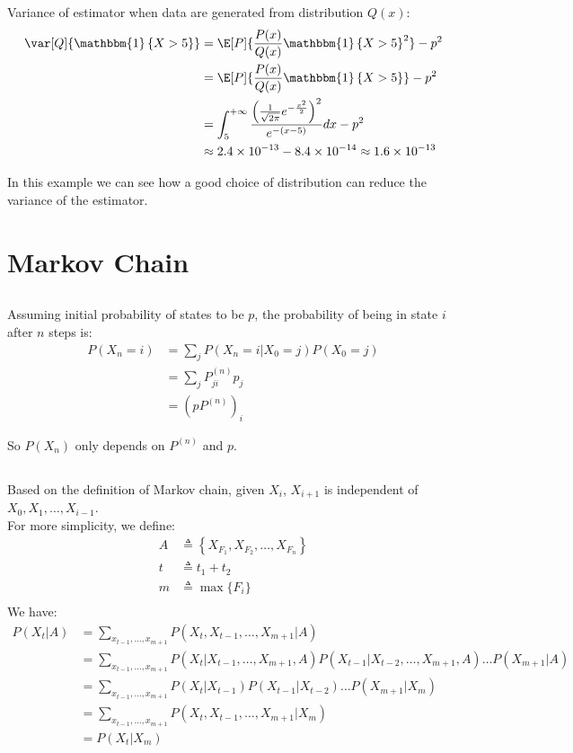 \documentclass{article}
\begin{document}
Variance of estimator when data are generated from distribution \(Q(x)\):
\begin{align*}
\var[Q]{\mathbbm{1}\left\{X > 5\right\}} &= \E[P]{\frac{P(x)}{Q(x)}\mathbbm{1}\left\{X > 5\right\}^2} - p^2\\
&= \E[P]{\frac{P(x)}{Q(x)}\mathbbm{1}\left\{X > 5\right\}} - p^2\\
&= \int_{5}^{+\infty} \frac{\left(\frac{1}{\sqrt{2\pi}} e^{-\frac{x^2}{2}}\right)^2}{e^{-(x-5)}} dx - p^2\\
&\approx 2.4 \times 10^{-13} - 8.4 \times 10^{-14} \approx 1.6 \times 10^{-13}
\end{align*}

In this example we can see how a good choice of distribution can reduce the variance of the estimator.

\section{Markov Chain}
\subsection{}
Assuming initial probability of states to be \(p\), the probability of being in state \(i\) after \(n\) steps is:
\begin{align*}
P(X_n=i) &= \sum_{j} P(X_n=i|X_0=j) P(X_0=j)\\
&= \sum_{j} P^{(n)}_{ji} p_j\\
&= (p P^{(n)})_i
\end{align*}

So \(P(X_n)\) only depends on \(P^{(n)}\) and \(p\).

\subsection{}
Based on the definition of Markov chain, given \(X_i\), \(X_{i+1}\) is independent of \(X_0, X_1, \dots, X_{i-1}\).\\
For more simplicity, we define:
\begin{align*}
A &\triangleq \left\{X_{F_1}, X_{F_2}, \dots, X_{F_n}\right\}\\
t &\triangleq t_1 + t_2\\
m &\triangleq \max\{F_i\}\\
\end{align*}
We have:
\begin{align*}
P(X_t|A) &= \sum_{x_{t-1}, \dots, x_{m+1}} P(X_t, X_{t-1}, \dots, X_{m+1}|A)\\
&= \sum_{x_{t-1}, \dots, x_{m+1}} P(X_t|X_{t-1}, \dots, X_{m+1}, A) P(X_{t-1}|X_{t-2}, \dots, X_{m+1}, A) \dots P(X_{m+1}|A)\\
&= \sum_{x_{t-1}, \dots, x_{m+1}} P(X_t|X_{t-1}) P(X_{t-1}|X_{t-2}) \dots P(X_{m+1}|X_{m})\\
&= \sum_{x_{t-1}, \dots, x_{m+1}} P(X_t, X_{t-1}, \dots, X_{m+1}|X_{m})\\
&= P(X_t|X_{m})
\end{align*}
\end{document}
